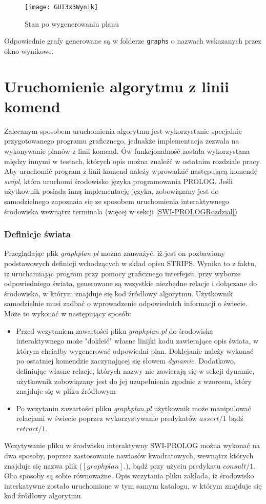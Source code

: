     \begin{figure}[H]
        \texttt{[image: GUI3x3Wynik]}
        \centering
        \caption{Stan po wygenerowaniu planu}
    \end{figure}

    Odpowiednie grafy generowane są w folderze \texttt{graphs} o nazwach wskazanych przez okno wynikowe.
\section{Uruchomienie algorytmu z linii komend}
    \label{CommandLine}
    Zalecanym sposobem uruchomienia algorytmu jest wykorzystanie specjalnie przygotowanego programu graficznego, jednakże implementacja zezwala na 
    wykonywanie planów z linii komend. Ów funkcjonalność została wykorzystana między innymi w testach, których opis można znaleźć w ostatnim rozdziale pracy.
    Aby uruchomić program z linii komend należy wprowadzić następującą komendę \textit{swipl}, która uruchomi środowisko języka programowania PROLOG.
    Jeśli użytkownik posiada inną implementację języka, zobowiązany jest do samodzielnego zapoznaia się ze sposobem uruchomienia interaktywnego 
    środowiska wewnątrz terminala (więcej w sekcji \ref{SWI-PROLOGRozdzial})
    \subsubsection{Definicje świata}
    Przeglądając plik \textit{graphplan.pl} można zauważyć, iż jest on pozbawiony podstawowych definicji wchodzących w skład opisu STRIPS. Wynika 
    to z faktu, iż uruchamiając program przy pomocy graficznego interfejsu, przy wyborze odpowiedniego świata, 
    generowane są wszystkie niezbędne relacje i dołączane do środowiska, w którym znajduje się kod źródłowy algorytmu.
    Użytkownik samodzielnie musi zadbać o wprowadzenie odpowiednich informacji o świecie. Może to wykonać w następujący sposób:
    \begin{itemize}
        \item Przed wczytaniem zawartości pliku \textit{graphplan.pl} do środowiska interaktywnego może "dokleić" własne linijki kodu 
        zawierające opis świata, w którym chciałby wygenerować odpowiedni plan. Doklejanie należy wykonać po ostatniej komendzie zaczynającej 
        się słowem \textit{dynamic}. Dodatkowo, definiując własne relacje, których nazwy nie zawierają się w sekcji dynamic, użytkownik 
        zobowiązany jest do jej uzupełnienia zgodnie z wzorcem, który znajduje się w pliku źródłowym
        \item Po wczytaniu zawartości pliku \textit{graphplan.pl} użytkownik może manipulować relacjami w świecie poprzez wykorzystywanie 
        predykatów $assert/1$ bądź $retract/1$. 
    \end{itemize}
    Wczytywanie pliku w środwisku interaktywny SWI-PROLOG można wykonać na dwa sposoby, poprzez zastosowanie nawiasów kwadratowych, wewnątrz których 
    znajduje się nazwa plik ($[graphplan].$), bądź przy użyciu predykatu $consult/1$. Oba sposoby są sobie równoważne. Opis wczytania pliku zakłada,
    iż środowisko interkatywne zostało uruchomione w tym samym katalogu, w którym znajduje się kod źródłowy algorytmu.
